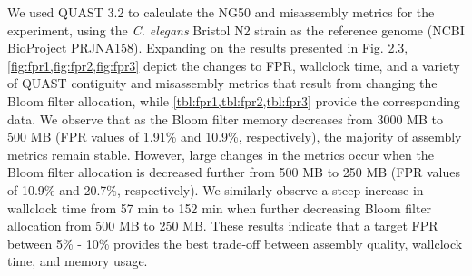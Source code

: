 \documentclass[
  12pt,
  oneside,
  openany]{book}
\begin{document}
\begin{appendices}
We used QUAST 3.2 to calculate the NG50 and misassembly metrics for the experiment, using the \emph{C. elegans} Bristol N2 strain as the reference genome (NCBI BioProject PRJNA158). Expanding on the results presented in Fig. 2.3, \cref{fig:fpr1,fig:fpr2,fig:fpr3} depict the changes to FPR, wallclock time, and a variety of QUAST contiguity and misassembly metrics that result from changing the Bloom filter allocation, while \cref{tbl:fpr1,tbl:fpr2,tbl:fpr3} provide the corresponding data. We observe that as the Bloom filter memory decreases from 3000 MB to 500 MB (FPR values of 1.91\% and 10.9\%, respectively), the majority of assembly metrics remain stable. However, large changes in the metrics occur when the Bloom filter allocation is decreased further from 500 MB to 250 MB (FPR values of 10.9\% and 20.7\%, respectively). We similarly observe a steep increase in wallclock time from 57 min to 152 min when further decreasing Bloom filter allocation from 500 MB to 250 MB. These results indicate that a target FPR between 5\% - 10\% provides the best trade-off between assembly quality, wallclock time, and memory usage.


\end{appendices}
\end{document}
